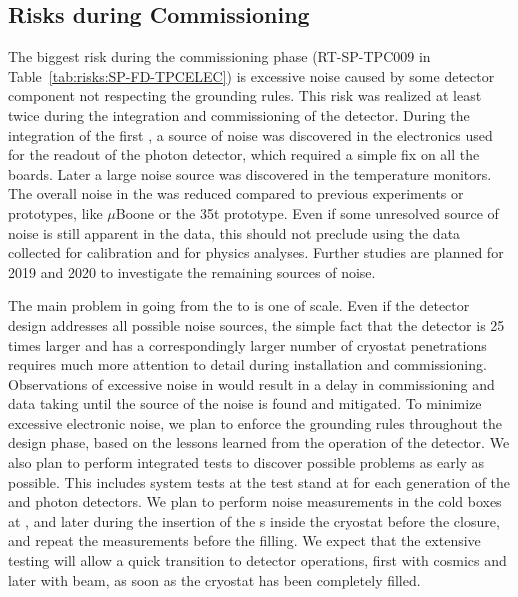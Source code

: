 \subsection{Risks during Commissioning}
\label{sec:fdsp-tpcelec-risks-commissioning}

The biggest risk during the commissioning phase
(RT-SP-TPC009 in Table~\ref{tab:risks:SP-FD-TPCELEC}) is excessive noise 
caused by some detector component not respecting the  grounding
rules. This risk was realized at least twice during the 
integration and commissioning of the  detector. During the 
integration of the first , a source of noise was discovered 
in the electronics used for the readout of the photon  detector, which 
required a simple fix on all the boards. Later a large noise source was 
discovered in the temperature monitors. The overall noise in the  
was reduced compared to previous  experiments or prototypes, 
like $\mu$Boone or the 35t prototype. Even if some unresolved source of noise 
is still apparent in the  data, this should not preclude using the
data collected for calibration and for physics analyses. Further studies are
planned for 2019 and 2020 to investigate the remaining sources of noise.

The main problem in going from the  to  is one of scale.
Even if the detector design addresses all possible noise sources, the simple
fact that the detector is 25 times larger and has a correspondingly larger
number of cryostat penetrations requires much more attention to detail
during installation and commissioning. Observations of excessive 
noise in  would result in a delay in commissioning and  
data taking until the source of the noise is found and mitigated. To minimize excessive 
electronic noise, we plan to enforce the grounding  rules throughout the 
design phase, based on the lessons learned from the operation of the 
 detector. We also plan to perform  integrated tests to discover 
possible problems as early as possible. This includes system tests at the  test stand at  for each generation 
of the  and photon detectors. We plan to perform noise 
measurements in the cold boxes at , and later 
during the insertion of the s inside the cryostat before the 
 closure, and repeat the measurements before the  filling. 
We expect that the extensive testing will allow a quick transition to 
detector operations, first with cosmics and later with beam, as soon as the 
cryostat has been completely filled. 

